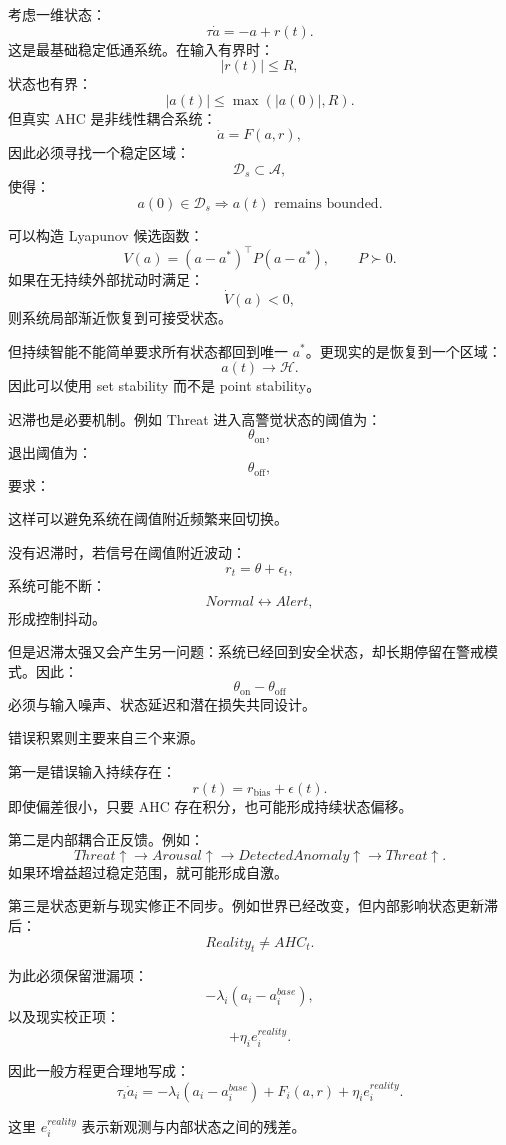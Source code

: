 考虑一维状态：
\[
\tau\dot a
=
-a+r(t).
\]
这是最基础稳定低通系统。在输入有界时：
\[
|r(t)|\leq R,
\]
状态也有界：
\[
|a(t)|\leq
\max(|a(0)|,R).
\]
但真实 AHC 是非线性耦合系统：
\[
\dot a
=
F(a,r),
\]
因此必须寻找一个稳定区域：
\[
\mathcal D_s
\subset
\mathcal A,
\]
使得：
\[
a(0)\in\mathcal D_s
\Rightarrow
a(t)
\text{ remains bounded}.
\]

可以构造 Lyapunov 候选函数：
\[
V(a)
=
(a-a^\ast)^\top
P
(a-a^\ast),
\qquad
P\succ0.
\]
如果在无持续外部扰动时满足：
\[
\dot V(a)<0,
\]
则系统局部渐近恢复到可接受状态。

但持续智能不能简单要求所有状态都回到唯一 \(a^\ast\)。更现实的是恢复到一个区域：
\[
a(t)\rightarrow\mathcal H.
\]
因此可以使用 set stability 而不是 point stability。

迟滞也是必要机制。例如 Threat 进入高警觉状态的阈值为：
\[
\theta_{\mathrm{on}},
\]
退出阈值为：
\[
\theta_{\mathrm{off}},
\]
要求：
\begin{statementbox}
\centering
{}
\end{statementbox}
这样可以避免系统在阈值附近频繁来回切换。

没有迟滞时，若信号在阈值附近波动：
\[
r_t=\theta+\epsilon_t,
\]
系统可能不断：
\[
Normal\leftrightarrow Alert,
\]
形成控制抖动。

但是迟滞太强又会产生另一问题：系统已经回到安全状态，却长期停留在警戒模式。因此：
\[
\theta_{\mathrm{on}}
-
\theta_{\mathrm{off}}
\]
必须与输入噪声、状态延迟和潜在损失共同设计。

错误积累则主要来自三个来源。

第一是错误输入持续存在：
\[
r(t)=r_{\mathrm{bias}}+\epsilon(t).
\]
即使偏差很小，只要 AHC 存在积分，也可能形成持续状态偏移。

第二是内部耦合正反馈。例如：
\[
Threat\uparrow
\rightarrow
Arousal\uparrow
\rightarrow
DetectedAnomaly\uparrow
\rightarrow
Threat\uparrow.
\]
如果环增益超过稳定范围，就可能形成自激。

第三是状态更新与现实修正不同步。例如世界已经改变，但内部影响状态更新滞后：
\[
Reality_t
\neq
AHC_t.
\]

为此必须保留泄漏项：
\[
-\lambda_i(a_i-a_i^{base}),
\]
以及现实校正项：
\[
+\eta_i e_i^{reality}.
\]

因此一般方程更合理地写成：
\[
\tau_i\dot a_i
=
-\lambda_i(a_i-a_i^{base})
+
F_i(a,r)
+
\eta_i e_i^{reality}.
\]

这里 \(e_i^{reality}\) 表示新观测与内部状态之间的残差。

